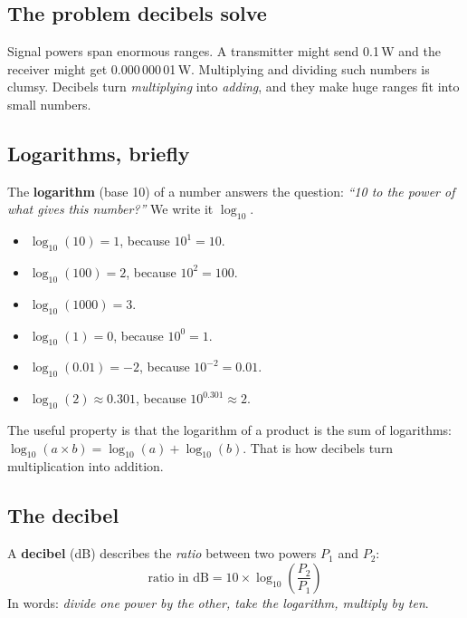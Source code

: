 \documentclass[11pt,a4paper]{article}
\begin{document}
\subsection{The problem decibels solve}

Signal powers span enormous ranges. A transmitter might send 0.1\,W and the receiver might get
0.000\,000\,01\,W. Multiplying and dividing such numbers is clumsy. Decibels turn
\emph{multiplying} into \emph{adding}, and they make huge ranges fit into small numbers.

\subsection{Logarithms, briefly}

The \textbf{logarithm} (base 10) of a number answers the question: \emph{``10 to the power of what
gives this number?''} We write it $\log_{10}$.
\begin{itemize}
  \item $\log_{10}(10) = 1$, because $10^1 = 10$.
  \item $\log_{10}(100) = 2$, because $10^2 = 100$.
  \item $\log_{10}(1000) = 3$.
  \item $\log_{10}(1) = 0$, because $10^0 = 1$.
  \item $\log_{10}(0.01) = -2$, because $10^{-2} = 0.01$.
  \item $\log_{10}(2) \approx 0.301$, because $10^{0.301} \approx 2$.
\end{itemize}
The useful property is that the logarithm of a product is the sum of logarithms:
$\log_{10}(a\times b) = \log_{10}(a) + \log_{10}(b)$. That is how decibels turn multiplication into addition.

\subsection{The decibel}

A \textbf{decibel} (dB) describes the \emph{ratio} between two powers $P_1$ and $P_2$:
\begin{equation}
\text{ratio in dB} = 10 \times \log_{10}\!\left(\frac{P_2}{P_1}\right)
\label{eq:db}
\end{equation}
In words: \emph{divide one power by the other, take the logarithm, multiply by ten}.
\end{document}
